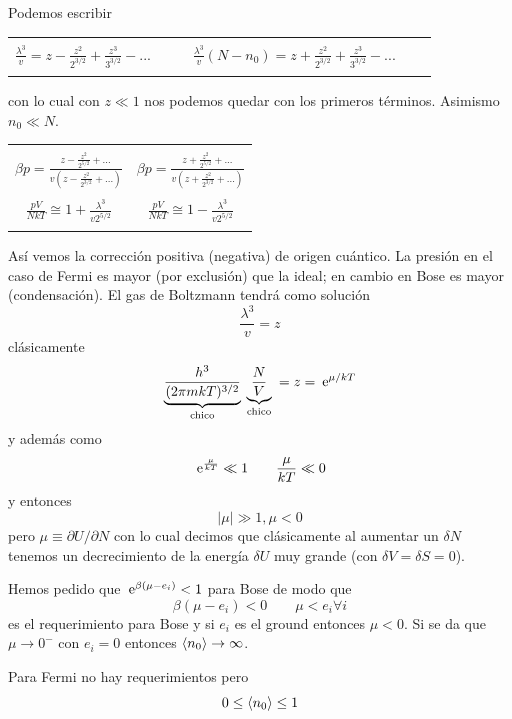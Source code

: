 \documentclass[10pt,oneside]{CBFT_book}
\begin{document}
Podemos escribir
\begin{center}
\begin{tabular}{c|c}
  & \\
$ \displaystyle \frac{\lambda^3}{v} = z - \frac{z^2}{2^{3/2}} + \frac{z^3}{3^{3/2}}  - ... \qquad $ & 
$ \displaystyle \frac{\lambda^3}{v}( N - n_0 ) = z + \frac{z^2}{2^{3/2}} + \frac{z^3}{3^{3/2}}  - ... \qquad $ \\
  & 
\end{tabular}
\end{center}
con lo cual con $z \ll 1$ nos podemos quedar con los primeros términos.
Asimismo $ n_0 \ll N$.
\begin{center}
\begin{tabular}{c|c}
  & \\
$ \displaystyle \beta p = \frac{z - \frac{z^2}{2^{5/2}} + ... }{v(z - \frac{z^2}{2^{3/2}} + ...)} $ & 
$ \displaystyle \beta p = \frac{z + \frac{z^2}{2^{5/2}} + ... }{v(z + \frac{z^2}{2^{3/2}} + ...)} $ \\
  & \\
$ \displaystyle \frac{pV}{NkT} \cong 1 + \frac{\lambda^3}{v 2^{5/2}} $ & 
$ \displaystyle \frac{pV}{NkT} \cong 1 - \frac{\lambda^3}{v 2^{5/2}} $ \\
  & 
\end{tabular}
\end{center}

Así vemos la corrección positiva (negativa) de origen cuántico.
La presión en el caso de Fermi es mayor (por exclusión) que la ideal; en cambio en
Bose es mayor (condensación).
El gas de Boltzmann tendrá como solución
\[
	\frac{\lambda^3}{v} = z
\]
clásicamente
\[
	\underbrace{ \frac{h^3}{(2 \pi m k T)^{3/2}} }_{ \text{ chico } } 
	\underbrace{\frac{N}{V}}_{ \text{ chico } } = z = \:\mathrm{e}^{\mu / kT}
\]
y además como 
\[
	\:\mathrm{e}^{\frac{\mu}{kT}} \ll 1 \qquad \frac{\mu}{kT} \ll 0
\]
y entonces
\[
	|\mu| \gg 1, \mu < 0
\]
pero $\mu \equiv \partial U / \partial N$ con lo cual decimos que clásicamente al
aumentar un $\delta N$ tenemos un decrecimiento de la energía $\delta U$ muy grande 
(con $\delta V = \delta S = 0$).

Hemos pedido que $\:\mathrm{e}^{\beta(\mu - e_i )} < 1 $ para Bose de modo que 
\[
	\beta(\mu - e_i ) < 0 \qquad \mu < e_i \forall i
\]
es el requerimiento para Bose y si $ e_i $ es el ground entonces $ \mu < 0 $.
Si se da que $ \mu \to 0^- $ con $ e_i = 0 $ entonces $ \braket{n_0} \to \infty $.

Para Fermi no hay requerimientos pero 
\[
	0 \leq \braket{n_0} \leq 1
\]
\end{document}
